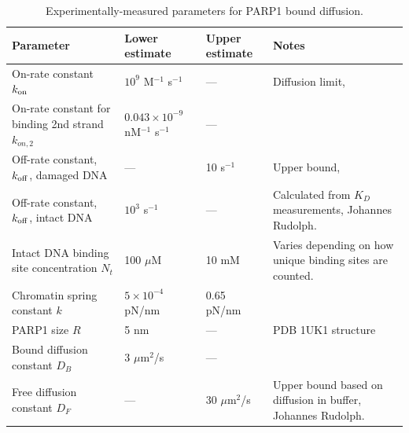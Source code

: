 \begin{table}[t!]
  \caption[Experimentally-measured parameters for PARP1 bound diffusion.]{Experimentally-measured parameters for PARP1 bound diffusion.}
    \label{table:parp1}
    \begin{tabular}{p{3cm}p{3cm}p{2.7cm}p{5.4cm}}
      Parameter & Lower estimate & Upper estimate  & Notes\\
      \hline
	On-rate constant $k_{\rm on}$ & $10^9$ M$^{-1}$ s$^{-1}$  & ---  &Diffusion limit, \cite{rudolph18}\\ \hline
On-rate constant for binding 2nd strand $k_{on,2}$ & $0.043 \times 10^{-9}$ nM$^{-1}$ s$^{-1}$  & ---  & \cite{rudolph18}\\ \hline
	Off-rate constant, $k_{\rm off}$, damaged DNA & --- & 10 s$^{-1}$  & Upper bound, \cite{rudolph18} \\ \hline
	Off-rate constant, $k_{\rm off}$, intact DNA & $10^3$ s$^{-1}$ & ---  & Calculated from  $K_D$ measurements, Johannes Rudolph.\\ \hline
	Intact DNA binding site concentration $N_t$ & 100 $\mu$M & 10 mM & Varies depending on how unique binding sites are counted.\\ \hline
	Chromatin spring constant $k$ & $5\times10^{-4}$ pN/nm & 0.65 pN/nm  & \cite{nozaki17, norouzi18}\\ \hline
	PARP1 size $R$ & 5 nm & ---  & PDB 1UK1 structure\\ \hline
	Bound diffusion constant $D_B$ & 3 $\mu$m$^2$/s & ---  & \cite{mahadevan18}\\ \hline
	Free diffusion constant $D_F$ & --- & 30 $\mu$m$^2$/s  & Upper bound based on diffusion in buffer, Johannes Rudolph.\\
 \hline
    \end{tabular}
\end{table}




